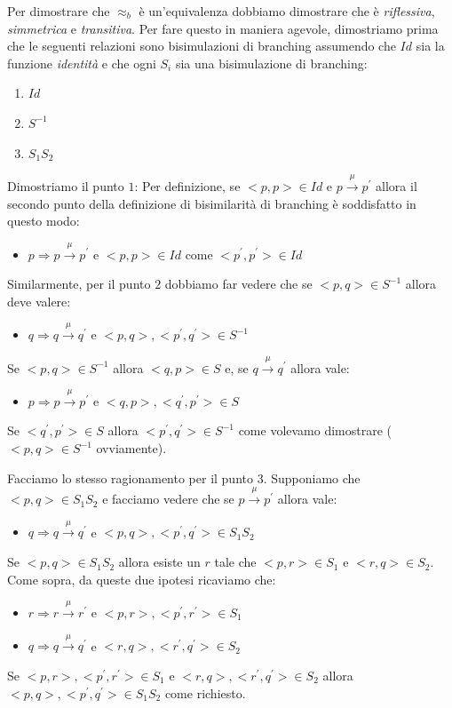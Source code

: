 		Per dimostrare che $\approx_{b}$ è un'equivalenza dobbiamo dimostrare che è \emph{riflessiva}, \emph{simmetrica} e \emph{transitiva}. Per fare questo in maniera agevole, dimostriamo prima che le seguenti relazioni sono bisimulazioni di branching assumendo che $Id$ sia la funzione \emph{identità} e che ogni $S_{i}$ sia una bisimulazione di branching:
		\begin{enumerate}
			\item $Id$
			\item $S^{-1}$
			\item $S_{1}S_{2}$
		\end{enumerate}
		
		Dimostriamo il punto $1$:
		Per definizione, se $<p,p>\in Id$ e $p \xrightarrow{\mu}p^{'}$ allora il secondo punto della definizione di bisimilarità di branching è soddisfatto in questo modo:
		\begin{itemize}
			\item $p \Rightarrow p\xrightarrow{\mu}p^{'}$ e $<p,p>\in Id$ come $<p^{'},p^{'}>\in Id$
		\end{itemize}
		
		Similarmente, per il punto $2$ dobbiamo far vedere che se $<p,q>\in S^{-1}$ allora deve valere:
		\begin{itemize}
			\item $q \Rightarrow q\xrightarrow{\mu}q^{'}$ e $<p,q>,<p^{'},q^{'}>\in S^{-1}$
		\end{itemize}
		Se $<p,q>\in S^{-1}$ allora $<q,p>\in S$ e, se $q \xrightarrow{\mu}q^{'}$ allora vale:
		\begin{itemize}
			\item $p \Rightarrow p\xrightarrow{\mu}p^{'}$ e $<q,p>,<q^{'},p^{'}>\in S$
		\end{itemize}
		Se $<q^{'},p^{'}>\in S$ allora $<p^{'},q^{'}>\in S^{-1}$ come volevamo dimostrare ($<p,q> \in S^{-1}$ ovviamente).
		
		\vspace{5 mm}
		Facciamo lo stesso ragionamento per il punto $3$. Supponiamo che $<p,q>\in S_{1}S_{2}$ e facciamo vedere che se $p \xrightarrow{\mu}p^{'}$ allora vale:
		\begin{itemize}
			\item $q \Rightarrow q\xrightarrow{\mu}q^{'}$ e $<p,q>,<p^{'},q^{'}>\in S_{1}S_{2}$
		\end{itemize}
		Se $<p,q>\in S_{1}S_{2}$ allora esiste un $r$ tale che $<p,r>\in S_{1}$ e $<r,q>\in S_{2}$. Come sopra, da queste due ipotesi ricaviamo che:
		\begin{itemize}
			\item $r \Rightarrow r\xrightarrow{\mu}r^{'}$ e $<p,r>,<p^{'},r^{'}>\in S_{1}$
			\item $q \Rightarrow q\xrightarrow{\mu}q^{'}$ e $<r,q>,<r^{'},q^{'}>\in S_{2}$
		\end{itemize}
		Se $<p,r>,<p^{'},r^{'}>\in S_{1}$ e $<r,q>,<r^{'},q^{'}>\in S_{2}$ allora $<p,q>,<p^{'},q^{'}>\in S_{1}S_{2}$ come richiesto.
		
